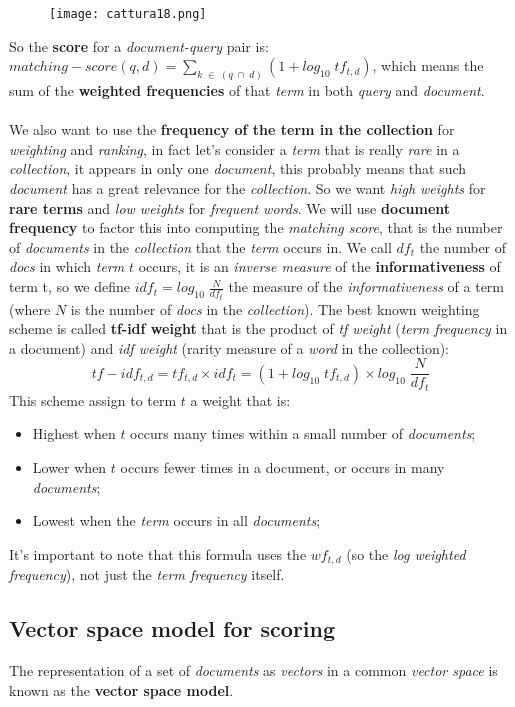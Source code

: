 \documentclass{article}
\begin{document}
\begin{figure}[H]
  \centering
  \texttt{[image: cattura18.png]}
\end{figure}
So the \textbf{score} for a \emph{document-query} pair is: $matching-score(q, d) = \sum_{k\; \in\; (q\; \cap\; d)}^{} (1 + log_{10}\; tf_{t,d})$, which means the sum of the \textbf{weighted frequencies} of that \emph{term} in both \emph{query} and \emph{document}. \\\\
We also want to use the \textbf{frequency of the term in the collection} for \emph{weighting} and \emph{ranking}, in fact let's consider a \emph{term} that is really \emph{rare} in a \emph{collection}, it appears in only one \emph{document}, this probably means that such \emph{document} has a great relevance for the \emph{collection}. So we want \emph{high weights} for \textbf{rare terms} and \emph{low weights} for \emph{frequent words}. We will use \textbf{document frequency} to factor this into computing the \emph{matching score}, that is the number of \emph{documents} in the \emph{collection} that the \emph{term} occurs in. \clearpage
\hfill \break
We call $df_t$ the number of \emph{docs} in which \emph{term} $t$ occurs, it is an \emph{inverse measure} of the \textbf{informativeness} of term t, so we define $idf_t = log_{10}\; \frac{N}{df_t}$ the measure of the \emph{informativeness} of a term (where $N$ is the number of \emph{docs} in the \emph{collection}). The best known weighting scheme is called\textbf{ tf-idf weight} that is the product of \emph{tf weight} (\emph{term frequency} in a document) and \emph{idf weight} (rarity measure of a \emph{word} in the collection): 
\[tf-idf_{t, d} = tf_{t, d} \times idf_t = (1 + log_{10}\; tf_{t, d}) \times log_{10}\; \frac{N}{df_t}\]
This scheme assign to term $t$ a weight that is:
\begin{itemize}
\item Highest when $t$ occurs many times within a small number of \emph{documents};
\item Lower when $t$ occurs fewer times in a document, or occurs in many \emph{documents};
\item Lowest when the \emph{term} occurs in all \emph{documents};
\end{itemize}
It's important to note that this formula uses the $wf_{t,d}$ (so the \emph{log weighted frequency}), not just the \emph{term frequency} itself.
\subsection{Vector space model for scoring}
The representation of a set of \emph{documents} as \emph{vectors} in a common \emph{vector space} is known as the \textbf{vector space model}.
\end{document}
